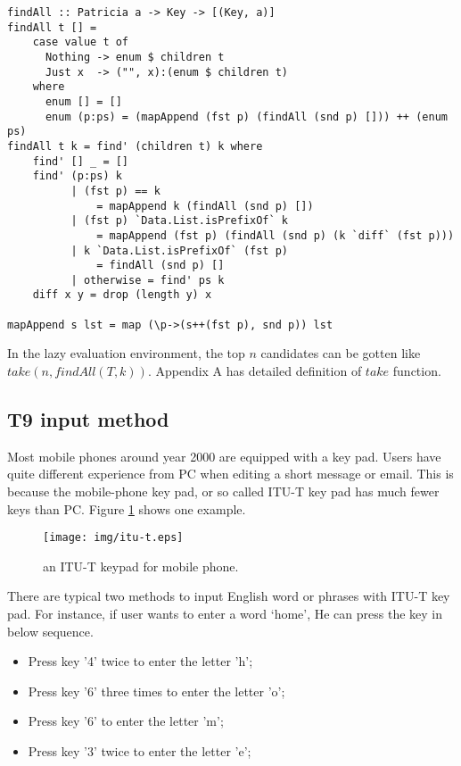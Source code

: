 \documentclass{article}
\begin{document}
\lstset{language=Haskell}
\begin{lstlisting}
findAll :: Patricia a -> Key -> [(Key, a)]
findAll t [] =
    case value t of
      Nothing -> enum $ children t
      Just x  -> ("", x):(enum $ children t)
    where
      enum [] = []
      enum (p:ps) = (mapAppend (fst p) (findAll (snd p) [])) ++ (enum ps)
findAll t k = find' (children t) k where
    find' [] _ = []
    find' (p:ps) k
          | (fst p) == k
              = mapAppend k (findAll (snd p) [])
          | (fst p) `Data.List.isPrefixOf` k
              = mapAppend (fst p) (findAll (snd p) (k `diff` (fst p)))
          | k `Data.List.isPrefixOf` (fst p)
              = findAll (snd p) []
          | otherwise = find' ps k
    diff x y = drop (length y) x

mapAppend s lst = map (\p->(s++(fst p), snd p)) lst
\end{lstlisting}

In the lazy evaluation environment, the top $n$ candidates can be
gotten like $take(n, findAll(T, k))$. Appendix A has detailed definition
of $take$ function.


\subsection{T9 input method}

Most mobile phones around year 2000 are equipped with a key pad.
Users have quite different experience from PC when editing a short message
or email.
This is because the mobile-phone key pad, or so called ITU-T key pad has much fewer
keys than PC. Figure \ref{fig:itut-keypad} shows one example.

\begin{figure}[htbp]
  \centering
  \texttt{[image: img/itu-t.eps]}
  \caption{an ITU-T keypad for mobile phone.}
  \label{fig:itut-keypad}
\end{figure}

There are typical two methods to input English word or phrases with ITU-T key pad.
For instance, if user wants to enter a word `home', He can press the key
in below sequence.

\begin{itemize}
\item Press key '4' twice to enter the letter 'h';
\item Press key '6' three times to enter the letter 'o';
\item Press key '6' to enter the letter 'm';
\item Press key '3' twice to enter the letter 'e';
\end{itemize}
\end{document}

